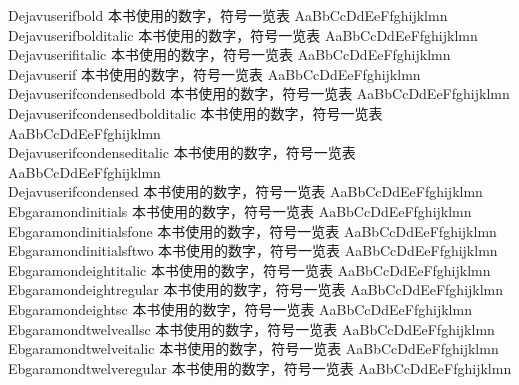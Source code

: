 Dejavuserifbold {\cjk\mktsFontfileDejavuserifbold{}本书使用的数字，符号一览表 AaBbCcDdEeFfghijklmn}\\
Dejavuserifbolditalic {\cjk\mktsFontfileDejavuserifbolditalic{}本书使用的数字，符号一览表 AaBbCcDdEeFfghijklmn}\\
Dejavuserifitalic {\cjk\mktsFontfileDejavuserifitalic{}本书使用的数字，符号一览表 AaBbCcDdEeFfghijklmn}\\
Dejavuserif {\cjk\mktsFontfileDejavuserif{}本书使用的数字，符号一览表 AaBbCcDdEeFfghijklmn}\\
Dejavuserifcondensedbold {\cjk\mktsFontfileDejavuserifcondensedbold{}本书使用的数字，符号一览表 AaBbCcDdEeFfghijklmn}\\
Dejavuserifcondensedbolditalic {\cjk\mktsFontfileDejavuserifcondensedbolditalic{}本书使用的数字，符号一览表 AaBbCcDdEeFfghijklmn}\\
Dejavuserifcondenseditalic {\cjk\mktsFontfileDejavuserifcondenseditalic{}本书使用的数字，符号一览表 AaBbCcDdEeFfghijklmn}\\
Dejavuserifcondensed {\cjk\mktsFontfileDejavuserifcondensed{}本书使用的数字，符号一览表 AaBbCcDdEeFfghijklmn}\\
Ebgaramondinitials {\cjk\mktsFontfileEbgaramondinitials{}本书使用的数字，符号一览表 AaBbCcDdEeFfghijklmn}\\
Ebgaramondinitialsfone {\cjk\mktsFontfileEbgaramondinitialsfone{}本书使用的数字，符号一览表 AaBbCcDdEeFfghijklmn}\\
Ebgaramondinitialsftwo {\cjk\mktsFontfileEbgaramondinitialsftwo{}本书使用的数字，符号一览表 AaBbCcDdEeFfghijklmn}\\
Ebgaramondeightitalic {\cjk\mktsFontfileEbgaramondeightitalic{}本书使用的数字，符号一览表 AaBbCcDdEeFfghijklmn}\\
Ebgaramondeightregular {\cjk\mktsFontfileEbgaramondeightregular{}本书使用的数字，符号一览表 AaBbCcDdEeFfghijklmn}\\
Ebgaramondeightsc {\cjk\mktsFontfileEbgaramondeightsc{}本书使用的数字，符号一览表 AaBbCcDdEeFfghijklmn}\\
Ebgaramondtwelveallsc {\cjk\mktsFontfileEbgaramondtwelveallsc{}本书使用的数字，符号一览表 AaBbCcDdEeFfghijklmn}\\
Ebgaramondtwelveitalic {\cjk\mktsFontfileEbgaramondtwelveitalic{}本书使用的数字，符号一览表 AaBbCcDdEeFfghijklmn}\\
Ebgaramondtwelveregular {\cjk\mktsFontfileEbgaramondtwelveregular{}本书使用的数字，符号一览表 AaBbCcDdEeFfghijklmn}\\
